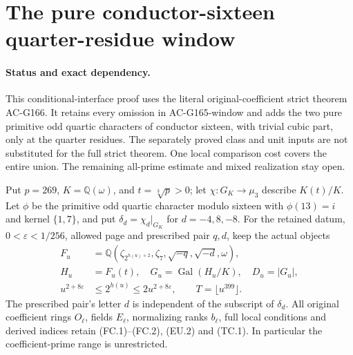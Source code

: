 \section{The pure conductor-sixteen quarter-residue window}
\label{sec:pure-conductor16-quarter-actual-window}

\paragraph{Status and exact dependency.}
This conditional-interface proof uses the literal original-coefficient
strict theorem AC-G166.  It retains every omission in AC-G165-window
and adds the two pure primitive odd quartic characters of conductor
sixteen, with trivial cubic part, only at the quarter residues.
The separately proved class and unit inputs are not substituted for
the full strict theorem.  One local comparison cost covers the entire union.
The remaining all-prime estimate and mixed realization stay open.

Put $p=269$, $K=\mathbb Q(\omega)$, and $t=\sqrt[3]p>0$;
let $\chi:G_K\to\mu_3$ describe $K(t)/K$.
Let $\phi$ be the primitive odd quartic character modulo sixteen
with $\phi(13)=i$ and kernel $\{1,7\}$, and put
$\delta_d=\chi_d|_{G_K}$ for $d=-4,8,-8$.
For the retained datum, $0<\varepsilon<1/256$, allowed page and
prescribed pair $q,d$, keep the actual objects
\[
 \begin{aligned}
 F_u&=\mathbb Q(\zeta_{2^{h(u)+2}},\zeta_7,
                           \sqrt{-q},\sqrt{-d},\omega),\\
 H_u&=F_u(t),\quad G_u=\operatorname{Gal}(H_u/K),\quad D_u=|G_u|,\\
 u^{2+8\varepsilon}&\leq2^{h(u)}\leq2u^{2+8\varepsilon},
                         \qquad T=\lfloor u^{399}\rfloor .
 \end{aligned}
 \tag{P16QW.1}
\]
The prescribed pair's letter $d$ is independent of the subscript
of $\delta_d$.
All original coefficient rings $O_\ell$, fields $E_\ell$,
normalizing ranks $b_\ell$, full local conditions and derived
indices retain (FC.1)--(FC.2), (EU.2) and (TC.1).
In particular the coefficient-prime range is unrestricted.

